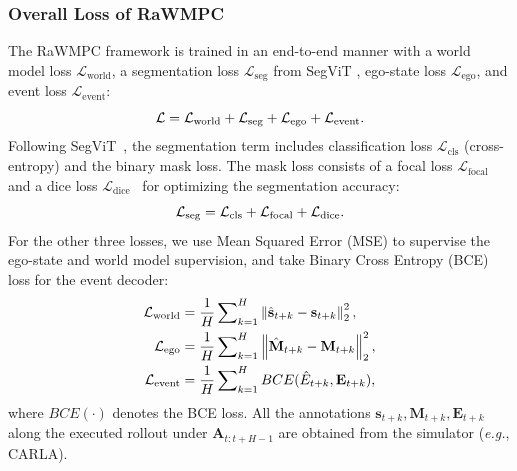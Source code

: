\documentclass[twocolumn]{template}
\theoremstyle{thmstyleone}%
\theoremstyle{thmstyletwo}%
\theoremstyle{thmstylethree}%
\begin{document}
\subsubsection{Overall Loss of RaWMPC}
The RaWMPC framework is trained in an end-to-end manner with a world model loss $\mathcal{L}_{\text{world}}$, a segmentation loss $\mathcal{L}_{\text{seg}}$ from SegViT \cite{SegViT}, ego-state loss $\mathcal{L}_{\text{ego}}$, and event loss $\mathcal{L}_{\text{event}}$:
\begin{equation}
\setlength{\abovedisplayskip}{3pt}
\mathcal{L} = \mathcal{L}_{\text{world}} + \mathcal{L}_{\text{seg}} + \mathcal{L}_{\text{ego}} + \mathcal{L}_{\text{event}}.
\setlength{\belowdisplayskip}{3pt}
\end{equation}
Following SegViT~\cite{SegViT}, the segmentation term includes classification loss $\mathcal{L}_{\text{cls}}$ (cross-entropy) and the binary mask loss. The mask loss consists of a focal loss $\mathcal{L}_{\text{focal}}$~\cite{Focal} and a dice loss $\mathcal{L}_{\text{dice}}$~\cite{Dice} for optimizing the segmentation accuracy:
\begin{equation}
\setlength{\abovedisplayskip}{2pt}
\label{eq:seg}
\mathcal{L}_{\text{seg}}=\mathbf{\mathcal{L}}_{\text{cls}}+\mathbf{\mathcal{L}}_{\text{focal}}+\mathbf{\mathcal{L}}_{\text{dice}}.
\setlength{\belowdisplayskip}{2pt}
\end{equation}
For the other three losses,
we use Mean Squared Error (MSE) to supervise the ego-state and world model supervision,
and take Binary Cross Entropy (BCE) loss for the event decoder:
\begin{align}
\setlength{\abovedisplayskip}{2pt}
\label{eq:meas}
\mathcal{L}_{\text{world}}&=\frac{1}{H}\sum\nolimits_{k=1}^{H}\left\| \hat{\mathbf{s}}_{t+k}-\mathbf{s}_{t+k}\right\|_2^2, \nonumber \\
\mathcal{L}_{\text{ego}}&=\frac{1}{H}\sum\nolimits_{k=1}^{H}\left\| \hat{\mathbf{M}}_{t+k}-\mathbf{M}_{t+k}\right\|_2^2, \\
\mathcal{L}_{\text{event}}&=\frac{1}{H}\sum\nolimits_{k=1}^{H} BCE(\hat{E}_{t+k}, \mathbf{E}_{t+k}), \nonumber
\setlength{\belowdisplayskip}{2pt}
\end{align}
where $BCE(\cdot)$ denotes the BCE loss.
All the annotations $\mathbf{s}_{t+k}, \mathbf{M}_{t+k}, \mathbf{E}_{t+k}$ along the executed rollout under $\mathbf{A}_{t:t+H-1}$ are obtained from the simulator (\textit{e.g.}, CARLA).
\end{document}
